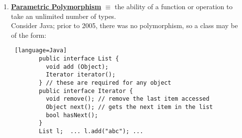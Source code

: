 \documentclass[../../lecture_notes.tex]{subfiles}
\begin{document}
\begin{enumerate} [itemsep=0mm]
\begin{enumerate} [itemsep=0mm]
\begin{itemize} [itemsep=0mm]
					\item does not accept {char, uchar, short, ushort}.
				\end{itemize}
				We would thus expect to have 196 variations of the operator, but with coercion we only need 4.\\
				This is because coercion follows the following rules:
				\begin{itemize} [itemsep=0mm]
					\item if sizeof(t) < sizeof(int), then cast T to int.
					\item if sizeof($T_1$) > sizeof($T_2$), cast $T_1$ to type($T_2$).
					\item else, cast both numbers to unsigned.
				\end{itemize}
				This can result in some unexpected behavior:
				\begin{lstlisting}[language=C]
int i, j; 
long l; 
i = j + l; // trap
// sometimes the values can even change
int i = -1;
unsigned j = i; // changed value; j == UINT_MAX
unsigned short k = i; // loses info
assert(i == j);
// this can even happen implicitly on comparison
int i = -1;
unsigned z = 0;
assert(i < z); // EXCEPTION -- i is converted to unsigned
// even literals are not immune to this behavior
assert(-1 < 2^34); // EXCEPTION -- 2^34 is converted to int, where it overflows
assert(-2^32 < 0); // EXCEPTION -- 2^32 is converted to unsigned, then negated, 
		   // but since it is unsigned, it is still nonnegative
				\end{lstlisting}
		\end{enumerate}
		These two types of ad-hoc polymorphism can interact to cause undefined behavior:
		\begin{lstlisting} [language=C]
		inf f(double x, int y);
		int f(int x, double y);
		f(3, 5); // which one does it call? 
		\end{lstlisting}
	\item \textbf{\underline{Parametric Polymorphism}}
		$\equiv$ the ability of a function or operation to take an unlimited number of types.\\
		Consider Java; prior to 2005, there was no polymorphism, so a class may be of the form:
		\begin{lstlisting} [language=Java]
		public interface List {
		  void add (Object);
		  Iterator iterator();
		} // these are required for any object
		public interface Iterator {
		  void remove(); // remove the last item accessed
		  Object next(); // gets the next item in the list
		  bool hasNext();
		} 
		List l;  ... l.add("abc"); ...

\end{lstlisting}
\end{enumerate}
\end{document}
